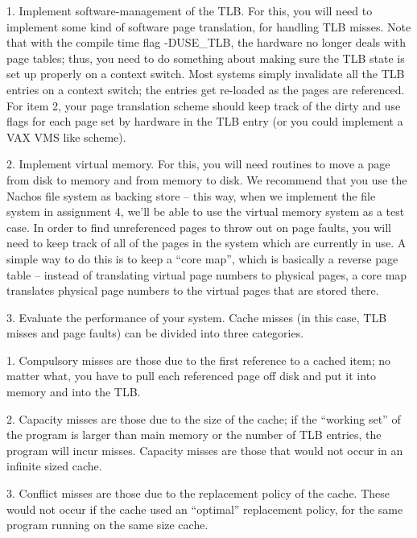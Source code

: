 \begin{description}
\item{1.} Implement software-management of the TLB.  For this, you
will need to implement some kind of software page translation, for handling
TLB misses.  Note that with the compile time flag -DUSE\_TLB, the hardware
no longer deals with page tables; thus, you need to do something about
making sure the TLB state is set up properly on a context switch.
Most systems simply
invalidate all the TLB entries on a context switch; the entries get re-loaded
as the pages are referenced.  For item 2, your page translation scheme
should keep track of the dirty and use flags for each page set by hardware
in the TLB entry (or you could implement a VAX VMS like scheme).

\item{2.}
Implement virtual memory.  For this, you will need routines
to move a page from disk to memory and from memory to disk.
We recommend that you use the Nachos file system as backing store --
this way, when we implement the file system in assignment 4,
we'll be able to use the virtual memory system as a test case.
In order to find unreferenced pages to throw out on page faults, you will need
to keep track of all of the pages in the system which are currently
in use.  A simple way to do this is to keep a ``core map'', which
is basically a reverse page table -- instead of translating virtual
page numbers to physical pages, a core map translates physical page numbers
to the virtual pages that are stored there.

\item{3.} Evaluate the performance of your system.
Cache misses (in this case, TLB misses and page faults) can be divided
into three categories.

\begin{description}
\item{1.} Compulsory misses are those due to the first
reference to a cached item; no matter what, you have to pull each referenced
page off disk and put it into memory and into the TLB. 

\item{2.} Capacity misses are those due to the size of the cache; 
if the ``working set'' of the program is larger than main memory or 
the number of TLB entries, the program will incur misses.
Capacity misses are those that would not occur in an infinite sized cache.

\item{3.} Conflict misses are those due to the replacement policy
of the cache.  These would not occur if the cache used an ``optimal''
replacement policy, for the same program running on the same size cache.
\end{description}


\end{description}
